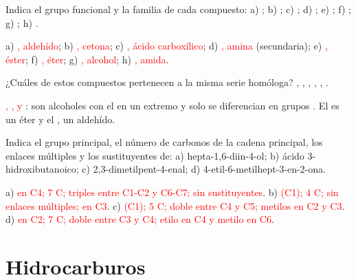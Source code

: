 \begin{exercise}
    Indica el grupo funcional y la familia de cada compuesto: a) ; b) ; c) ;
    d) ; e) ; f) ; g) ; h) .
    \begin{solu}
        a) \textcolor{red}{, aldehído}; b) \textcolor{red}{, cetona}; c) \textcolor{red}{, ácido
        carboxílico}; d) \textcolor{red}{, amina} (secundaria); e) \textcolor{red}{, éster}; f)
        \textcolor{red}{, éter}; g) \textcolor{red}{, alcohol}; h) \textcolor{red}{, amida}.
    \end{solu}
\end{exercise}

\begin{exercise}
    ¿Cuáles de estos compuestos pertenecen a la misma serie homóloga? , , ,
    , , .
    \begin{solu}
        \textcolor{red}{, ,  y }: son alcoholes con el  en un
        extremo y solo se diferencian en grupos . El  es un éter y el , un aldehído.
    \end{solu}
\end{exercise}

\begin{exercise}
    Indica el grupo principal, el número de carbonos de la cadena principal, los enlaces múltiples y los sustituyentes de:
    a) hepta-1,6-diin-4-ol; b) ácido 3-hidroxibutanoico; c) 2,3-dimetilpent-4-enal; d) 4-etil-6-metilhept-3-en-2-ona.
    \begin{solu}
        a) \textcolor{red}{ en C4; 7 C; triples entre C1-C2 y C6-C7; sin sustituyentes}. b) \textcolor{red}{ (C1);
        4 C; sin enlaces múltiples;  en C3}. c) \textcolor{red}{ (C1); 5 C; doble entre C4 y C5; metilos en C2 y
        C3}. d) \textcolor{red}{ en C2; 7 C; doble entre C3 y C4; etilo en C4 y metilo en C6}.
    \end{solu}
\end{exercise}

\section{Hidrocarburos}\label{sec:ud7-hidrocarburos}

